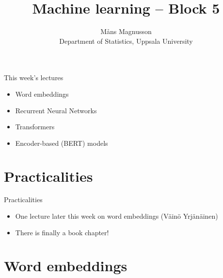 \documentclass[10pt]{beamer}
\title[]{{\color{black}Machine learning -- Block 5}}
\author[]{M{\aa}ns Magnusson\\Department of Statistics, Uppsala University}
\date{\currentsemester}
\begin{document}
\frame{\titlepage
}



\begin{frame}{This week's lectures}
\begin{itemize}
\item Word embeddings
\item Recurrent Neural Networks
\item Transformers
\item Encoder-based (BERT) models
\end{itemize}
\end{frame}




\section{Practicalities}

\begin{frame}{Practicalities}

\begin{itemize}
\item One lecture later this week on word embeddings (Väinö Yrjänäinen)
\item There is finally a book chapter!
\end{itemize}

\end{frame}


%
%


\section{Word embeddings}
\frame{\sectionpage}
\end{document}
